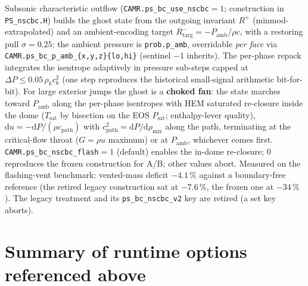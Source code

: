 \documentclass[11pt,a4paper]{article}
\newcommand{\code}[1]{\texttt{\small #1}}
\begin{document}
Subsonic characteristic outflow (\code{CAMR.ps\_bc\_use\_nscbc}$=1$;
construction in \code{PS\_nscbc.H}) builds the ghost state from the
outgoing invariant $R^+$ (minmod-extrapolated) and an ambient-encoding
target $R^-_{\mathrm{targ}}=-P_{\mathrm{amb}}/\rho c$, with a restoring
pull $\sigma=0.25$; the ambient pressure is \code{prob.p\_amb}, overridable
\emph{per face} via \code{CAMR.ps\_bc\_p\_amb\_\{x,y,z\}\{lo,hi\}}
(sentinel $-1$ inherits).  The per-phase repack integrates the isentrope
adaptively in pressure sub-steps capped at
$\Delta P \le 0.05\,\rho_k c_k^2$ (one step reproduces the historical
small-signal arithmetic bit-for-bit).  For large exterior jumps the ghost
is a \textbf{choked fan}: the state marches toward $P_{\mathrm{amb}}$
along the per-phase isentropes with HEM saturated re-closure inside the
dome ($T_{\mathrm{sat}}$ by bisection on the EOS $P_{\mathrm{sat}}$;
enthalpy-lever quality), $\mathrm{d}u = -\mathrm{d}P/(\rho c_{\mathrm{path}})$
with $c_{\mathrm{path}}^2 = \mathrm{d}P/\mathrm{d}\rho_{\mathrm{mix}}$
along the path, terminating at the critical-flow throat ($G=\rho u$
maximum) or at $P_{\mathrm{amb}}$, whichever comes first.
\code{CAMR.ps\_bc\_nscbc\_flash}$=1$ (default) enables the in-dome
re-closure; $0$ reproduces the frozen construction for A/B; other values
abort.  Measured on the flashing-vent benchmark: vented-mass deficit
$-4.1\,\%$ against a boundary-free reference (the retired legacy
construction sat at $-7.6\,\%$, the frozen one at $-34\,\%$).  The legacy
treatment and its \code{ps\_bc\_nscbc\_v2} key are retired (a set key
aborts).

\section*{Summary of runtime options referenced above}
\end{document}
